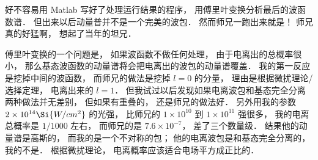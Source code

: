 好不容易用 Matlab 写好了处理运行结果的程序， 用傅里叶变换分析最后的波函数谱． 但出来以后动量普并不是一个完美的波包． 然而师兄一跑出来就是！ 师兄真的好猛啊， 想起了当年的坦兄．

傅里叶变换的一个问题是， 如果波函数不做任何处理， 由于电离出的总概率很小， 那么基态波函数的动量谱将会把电离出的波包的动量谱覆盖． 我的第一反应是挖掉中间的波函数， 而师兄的做法是挖掉 $l = 0$ 的分量， 理由是根据微扰理论/选择定理， 电离出来的 $l = 1$． 但我试过以后发现如果电离波包和基态完全分离两种做法并无差别， 但如果有重叠的， 还是师兄的做法好． 另外用我的参数 $2\times 10^{14} \Si{W/cm^2}$ 的光强， 比师兄的 $1\times 10^{10}$ 到 $1\times 10^{11}$ 强很多， 我的电离总概率是 $1/1000$ 左右， 而师兄的是 $7.6\times 10^{-7}$， 差了三个数量级． 结果他的动量谱是高斯的， 而我的是一个不对称的包； 他的电离波包是和基态完全分离的， 我的不是． 根据微扰理论， 电离概率应该适合电场平方成正比的．
